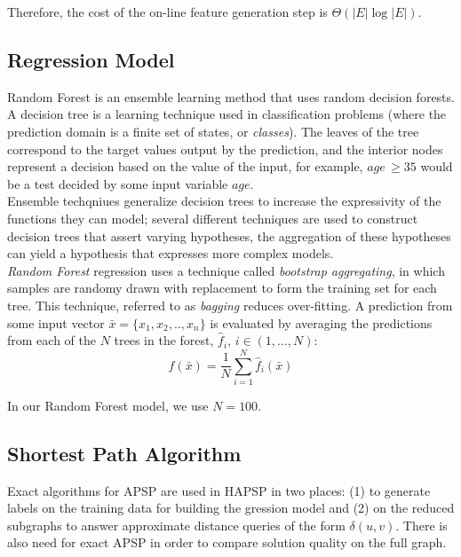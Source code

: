 \documentclass[10.5pt,journal]{IEEEtran}
\begin{document}
	Therefore, the cost of the on-line feature generation step is $\Theta(|E|\log|E|)$.
	
\subsection{Regression Model}
	Random Forest is an ensemble learning method that uses random decision forests\cite{randForest}. 
	A decision tree
	is a learning technique used in classification problems (where the prediction domain is a finite
	set of states, or {\it{classes}}). The leaves of the tree correspond to the target values output
	by the prediction, and the interior nodes represent a decision based on the value of the input,
	for example, $age\,\ge 35$ would be a test decided by some input variable $age$. \\
	
	Ensemble
	techqniues generalize decision trees to increase the expressivity of the functions they can
	model; several different techniques are used to construct decision trees that assert
	varying hypotheses, the aggregation of these hypotheses can yield a hypothesis that expresses
	more complex models. \\
	
	{\it{Random Forest}} regression uses a technique called {\it{bootstrap aggregating}}, in
	which samples are randomy drawn with replacement to form the training set for each tree.
	This technique, referred to as {\it{bagging}} reduces over-fitting. A prediction from
	some input vector $\bar{x} = \{x_1,x_2,..,x_n\}$ is evaluated by averaging the
	predictions from each of the $N$ trees in the forest, $\hat{f}_i,\,i\in (1,...,N)$:
		\[f(\bar{x}) = \frac{1}{N} \sum_{i=1}^N\hat{f}_i(\bar{x})\]
	
	In our Random Forest model, we use $N=100$. 

\subsection{Shortest Path Algorithm}
	Exact algorithms for APSP are used in HAPSP in two places: (1) to generate labels on the training
	data for building the gression model and (2) on the reduced subgraphs to answer approximate
	distance queries of the form $\delta(u,v)$. There is also need for exact APSP in order to
	compare solution quality on the full graph. \\
	
\end{document}
